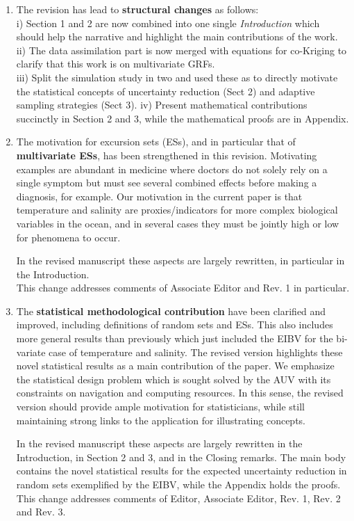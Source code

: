 \documentclass[a4paper]{article}
\begin{document}
\begin{enumerate}
\item The revision has lead to {\bf{structural changes}} as follows: \\
    i) Section 1 and 2 are now combined into one single \emph{Introduction} which should help the narrative and highlight the main contributions of the work. \\
    ii) The data assimilation part is now merged with equations for co-Kriging to clarify that this work is on multivariate GRFs. \\
    iii) Split the simulation study in two and used these as to directly motivate the statistical concepts of uncertainty reduction (Sect 2) and adaptive sampling strategies (Sect 3).
    iv) Present mathematical contributions succinctly in Section 2 and 3, while the mathematical proofs are in Appendix.

\item The motivation for excursion sets (ESs), and in particular that of {\bf{multivariate ESs}}, has been strengthened in this revision. Motivating examples are abundant in medicine where doctors do not solely rely on a single symptom but must see several combined effects before making a diagnosis, for example. Our motivation in the current paper is that temperature and salinity are proxies/indicators for more complex biological variables in the ocean, and in several cases they must be jointly high or low for phenomena to occur. 

In the revised manuscript these aspects are largely rewritten, in particular in the Introduction. \\
This change addresses comments of Associate Editor and Rev. 1 in particular.

\item The {\bf{statistical methodological contribution}} have been clarified and improved, including definitions of random sets and ESs. This also includes more general results than previously which just included the EIBV for the bi-variate case of temperature and salinity. The revised version highlights these novel statistical results as a main contribution of the paper. 
We emphasize the statistical design problem which is sought solved by the AUV with its constraints on navigation and computing resources.
In this sense, the revised version should provide ample motivation for statisticians, while still maintaining strong links to the application for illustrating concepts.

In the revised manuscript these aspects are largely rewritten in the Introduction, in Section 2 and 3, and in the Closing remarks. The main body contains the novel statistical results for the expected uncertainty reduction in random sets exemplified by the EIBV, while the Appendix holds the proofs. \\
This change addresses comments of Editor, Associate Editor, Rev. 1, Rev. 2 and Rev. 3.


\end{enumerate}
\end{document}

